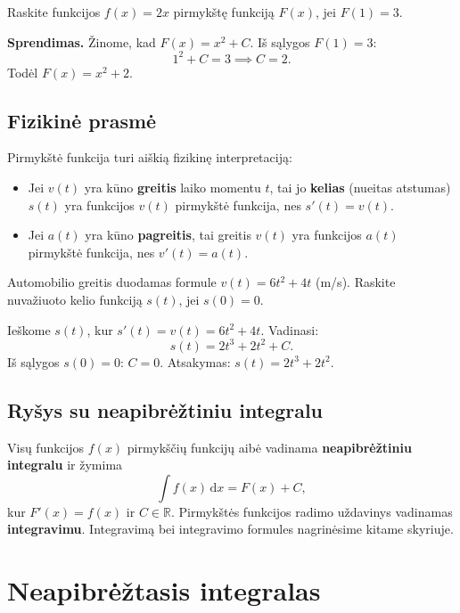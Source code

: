 \begin{example}
Raskite funkcijos $f(x) = 2x$ pirmykštę funkciją $F(x)$, jei $F(1) = 3$.

\textbf{Sprendimas.} Žinome, kad $F(x) = x^2 + C$. Iš sąlygos $F(1)=3$:
\[
    1^2 + C = 3 \implies C = 2.
\]
Todėl $F(x) = x^2 + 2$.
\end{example}

\subsection*{Fizikinė prasmė}

Pirmykštė funkcija turi aiškią fizikinę interpretaciją:
\begin{itemize}
    \item Jei $v(t)$ yra kūno \textbf{greitis} laiko momentu $t$, tai jo \textbf{kelias} (nueitas atstumas)
          $s(t)$ yra funkcijos $v(t)$ pirmykštė funkcija, nes $s'(t)=v(t)$.
    \item Jei $a(t)$ yra kūno \textbf{pagreitis}, tai greitis $v(t)$ yra funkcijos $a(t)$
          pirmykštė funkcija, nes $v'(t)=a(t)$.
\end{itemize}

\begin{exercise}
Automobilio greitis duodamas formule $v(t) = 6t^2 + 4t$ (m/s). Raskite nuvažiuoto kelio
funkciją $s(t)$, jei $s(0) = 0$.
\end{exercise}

\begin{example}
Ieškome $s(t)$, kur $s'(t)=v(t)=6t^2+4t$. Vadinasi:
\[
    s(t) = 2t^3 + 2t^2 + C.
\]
Iš sąlygos $s(0)=0$: $C=0$. Atsakymas: $s(t) = 2t^3 + 2t^2$.
\end{example}

\subsection*{Ryšys su neapibrėžtiniu integralu}

Visų funkcijos $f(x)$ pirmykščių funkcijų aibė vadinama \textbf{neapibrėžtiniu integralu}
ir žymima
\[
    \int f(x)\,\mathrm{d}x = F(x) + C,
\]
kur $F'(x) = f(x)$ ir $C \in \mathbb{R}$. Pirmykštės funkcijos radimo uždavinys vadinamas
\textbf{integravimu}. Integravimą bei integravimo formules nagrinėsime kitame skyriuje.


\section{Neapibrėžtasis integralas}

